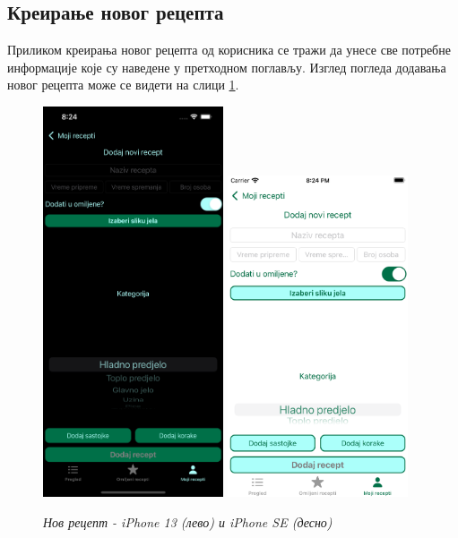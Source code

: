 \documentclass[12pt,oneside]{memoir}
\begin{document}
\subsection{Креирање новог рецепта}
\label{subsec:Креирање новог рецепта}

\indent Приликом креирања новог рецепта од корисника се тражи да унесе све потребне информације које су наведене у претходном поглављу. Изглед погледа додавања новог рецепта може се видети на слици \ref{slika:нов_рецепт_1}.

\begin{figure} [H]
    \centering
    \captionsetup{justification=centering}
    \includegraphics[width=0.475\textwidth]{images/simulators/view images/dark - new.png} 
    \hfill
    \includegraphics[width=0.475\textwidth]{images/simulators/view images/light - new.png} 
    \caption{\textit{Нов рецепт - iPhone 13 (лево) и iPhone SE (десно)}}
    \label{slika:нов_рецепт_1}
\end{figure}
\end{document}
